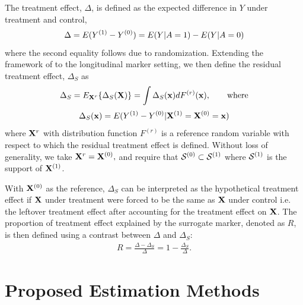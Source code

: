 \documentclass[useAMS,usenatbib,referee]{biom}
\begin{document}
The treatment effect, $\Delta$, is defined as the 
expected difference in \(Y\) under treatment and control,
\[\Delta=E(Y^{(1)}-Y^{(0)}) = E(Y|A=1)-E(Y|A=0)\]
where the second equality follows due to randomization. Extending the framework of \cite{parast2016robust} to the longitudinal marker setting, we then define the residual treatment effect, $\Delta_S$ as 
$$\Delta_S = E_{{\bf X}^{r}}\{\Delta_S({\bf X})\} = \int \Delta_S({\bf x}) dF^{(r)}({\bf x}), \quad \quad \mbox{where}$$
$$\Delta_S({\bf x}) = E(Y^{(1)}-Y^{(0)} | {\bf X}^{(1)} = {\bf X}^{(0)}={\bf x})$$
where ${\bf X}^{r}$ with distribution function $F^{(r)}$ is a reference random variable with respect to which the residual treatment effect is defined.  Without loss of generality, we take ${\bf X}^{r} = {\bf X} ^{(0)},$ and require that $\Ssc\szero \subset \Ssc\sone$ where $\Ssc\sone$ is the support of ${\bf X}^{(1)}$. 

With ${\bf X}^{(0)}$ as the reference, $\Delta_S$ can be interpreted as the hypothetical treatment effect if ${\bf X}$ under treatment were forced to be the same as ${\bf X}$ under control i.e. the leftover treatment effect after accounting for the treatment effect on ${\bf X}$. The proportion of treatment effect explained by the surrogate marker, denoted as $R$, is then defined using a contrast between $\Delta$ and $\Delta_S$:
\begin{align}
    R = \frac{\Delta - \Delta_S}{\Delta} = 1 - \frac{\Delta_S}{\Delta}.
\end{align}

\section{Proposed Estimation Methods}\label{sec:2}
\end{document}

